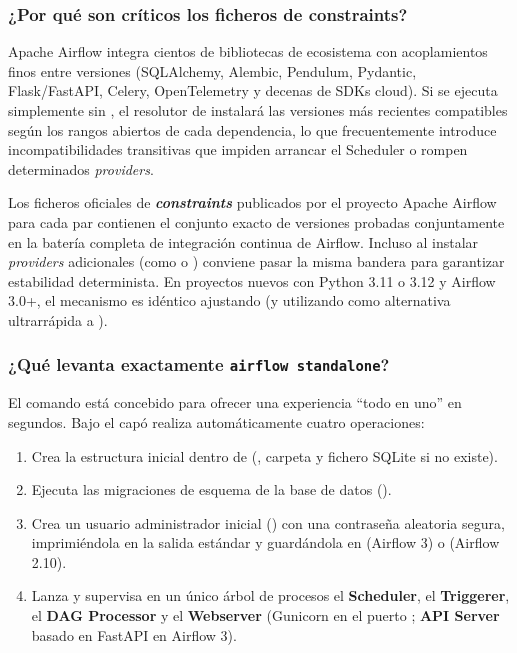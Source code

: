 \subsubsection{¿Por qué son críticos los ficheros de constraints?}

Apache Airflow integra cientos de bibliotecas de ecosistema con acoplamientos finos entre versiones (SQLAlchemy, Alembic, Pendulum, Pydantic, Flask/FastAPI, Celery, OpenTelemetry y decenas de SDKs cloud). Si se ejecuta simplemente  sin , el resolutor de  instalará las versiones más recientes compatibles según los rangos abiertos de cada dependencia, lo que frecuentemente introduce incompatibilidades transitivas que impiden arrancar el Scheduler o rompen determinados \textit{providers}.

Los ficheros oficiales de \textbf{\textit{constraints}} publicados por el proyecto Apache Airflow para cada par  contienen el conjunto exacto de versiones probadas conjuntamente en la batería completa de integración continua de Airflow. Incluso al instalar \textit{providers} adicionales (como  o ) conviene pasar la misma bandera  para garantizar estabilidad determinista. En proyectos nuevos con Python 3.11 o 3.12 y Airflow 3.0+, el mecanismo es idéntico ajustando  (y utilizando  como alternativa ultrarrápida a ).

\subsubsection{¿Qué levanta exactamente \texttt{airflow standalone}?}

El comando  está concebido para ofrecer una experiencia ``todo en uno'' en segundos. Bajo el capó realiza automáticamente cuatro operaciones:
\begin{enumerate}
  \item Crea la estructura inicial dentro de  (, carpeta  y fichero SQLite  si no existe).
  \item Ejecuta las migraciones de esquema de la base de datos ().
  \item Crea un usuario administrador inicial () con una contraseña aleatoria segura, imprimiéndola en la salida estándar y guardándola en  (Airflow 3) o  (Airflow 2.10).
  \item Lanza y supervisa en un único árbol de procesos el \textbf{Scheduler}, el \textbf{Triggerer}, el \textbf{DAG Processor} y el \textbf{Webserver} (Gunicorn en el puerto ; \textbf{API Server} basado en FastAPI en Airflow 3).
\end{enumerate}

